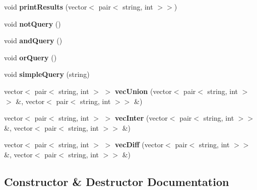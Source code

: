 \begin{DoxyCompactItemize}
\item 
void {\bfseries print\+Results} (vector$<$ pair$<$ string, int $>$$>$)\hypertarget{classSearcher_a35c4f7fcc9c1a6fe360448cfae723f20}{}\label{classSearcher_a35c4f7fcc9c1a6fe360448cfae723f20}

\item 
void {\bfseries not\+Query} ()\hypertarget{classSearcher_a07dfcc668e26a8fc02cf9d2fab38fcd0}{}\label{classSearcher_a07dfcc668e26a8fc02cf9d2fab38fcd0}

\item 
void {\bfseries and\+Query} ()\hypertarget{classSearcher_aeed3826ef9cf5f51e7ac02d8c733b0b0}{}\label{classSearcher_aeed3826ef9cf5f51e7ac02d8c733b0b0}

\item 
void {\bfseries or\+Query} ()\hypertarget{classSearcher_ab1c49f35a01453a6027d1ec3084cf1eb}{}\label{classSearcher_ab1c49f35a01453a6027d1ec3084cf1eb}

\item 
void {\bfseries simple\+Query} (string)\hypertarget{classSearcher_a4c107807ebd11a4cca3f5d4a20ae68d2}{}\label{classSearcher_a4c107807ebd11a4cca3f5d4a20ae68d2}

\item 
vector$<$ pair$<$ string, int $>$ $>$ {\bfseries vec\+Union} (vector$<$ pair$<$ string, int $>$$>$ \&, vector$<$ pair$<$ string, int $>$$>$ \&)\hypertarget{classSearcher_a6fc303a482269b55189352f6e8675f0e}{}\label{classSearcher_a6fc303a482269b55189352f6e8675f0e}

\item 
vector$<$ pair$<$ string, int $>$ $>$ {\bfseries vec\+Inter} (vector$<$ pair$<$ string, int $>$$>$ \&, vector$<$ pair$<$ string, int $>$$>$ \&)\hypertarget{classSearcher_a4fbda837263223f8ddaea3f2884857d4}{}\label{classSearcher_a4fbda837263223f8ddaea3f2884857d4}

\item 
vector$<$ pair$<$ string, int $>$ $>$ {\bfseries vec\+Diff} (vector$<$ pair$<$ string, int $>$$>$ \&, vector$<$ pair$<$ string, int $>$$>$ \&)\hypertarget{classSearcher_a8fed1b027e3e69e8841d2a93b915c7a1}{}\label{classSearcher_a8fed1b027e3e69e8841d2a93b915c7a1}

\end{DoxyCompactItemize}


\subsection{Constructor \& Destructor Documentation}
